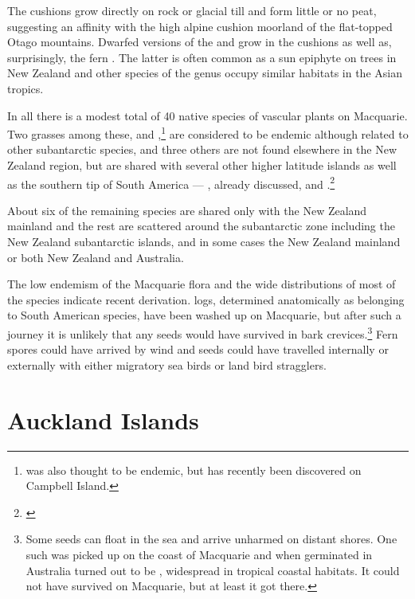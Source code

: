 The cushions grow directly on rock or glacial till and form little or no peat, suggesting an affinity with the high alpine cushion moorland of the flat-topped Otago mountains.
Dwarfed versions of the  and  grow in the cushions as well as, surprisingly, the fern .
The latter is often common as a sun epiphyte on trees in New Zealand and other species of the genus occupy similar habitats in the Asian tropics.

In all there is a modest total of 40 native species of vascular plants on Macquarie.
Two grasses among these,  and ,\footnote{ was also thought to be endemic, but has recently been discovered on Campbell Island.} are considered to be endemic although related to other subantarctic species, and three others are not found elsewhere in the New Zealand region, but are shared with several other higher latitude islands as well as the southern tip of South America --- , already discussed,  and .\footnote{\cite{wace1960botany}}

About six of the remaining species are shared only with the New Zealand mainland and the rest are scattered around the subantarctic zone including the New Zealand subantarctic islands, and in some cases the New Zealand mainland or both New Zealand and Australia.

The low endemism of the Macquarie flora and the wide distributions of most of the species indicate recent derivation.  logs, determined anatomically as belonging to South American species, have been washed up on Macquarie, but after such a journey it is unlikely that any seeds would have survived in bark crevices.\footnote{Some seeds can float in the sea and arrive unharmed on distant shores. One such was picked up on the coast of Macquarie and when germinated in Australia turned out to be , widespread in tropical coastal habitats. It could not have survived on Macquarie, but at least it got there.}
Fern spores could have arrived by wind and seeds could have travelled internally or externally with either migratory sea birds or land bird stragglers.

\section{Auckland Islands}


